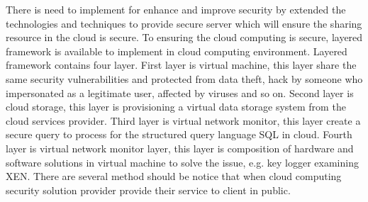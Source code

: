 \documentclass[a4paper, 12pt]{article}
\begin{document}
There is need to implement for enhance and improve security by extended the technologies and techniques to provide secure server which will ensure the sharing resource in the cloud is secure. To ensuring the cloud computing is secure, layered framework is available to implement in cloud computing environment. Layered framework contains four layer. First layer is virtual machine, this layer share the same security vulnerabilities and protected from data theft, hack by someone who impersonated as a legitimate user, affected by viruses and so on. Second layer is cloud storage, this layer is provisioning a virtual data storage system from the cloud services provider. Third layer is virtual network monitor, this layer create a secure query to process for the structured query language SQL in cloud. Fourth layer is virtual network monitor layer, this layer is composition of hardware and software solutions in virtual machine to solve the issue, e.g. key logger examining XEN. \cite{ysterud2014keylogging} There are several method should be notice that when cloud computing security solution provider provide their service to client in public.
\end{document}

